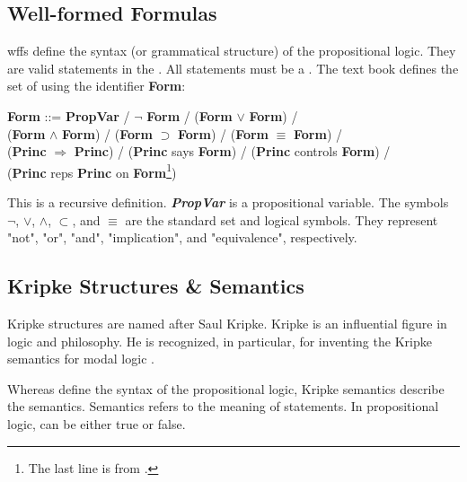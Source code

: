 \documentclass[../../main/main.tex]{subfiles}
\begin{document}
\subsection{Well-formed Formulas}\label{ssec:wff}
\Glspl{wff} define the syntax (or grammatical structure) of the propositional logic.  They are valid statements in the .  All  statements must be a .  The text book defines the set of  using the identifier \textbf{Form}:

\begin{center}
\textbf{Form} ::= \textbf{PropVar} / $\neg$ \textbf{Form} / (\textbf{Form} $\vee$ \textbf{Form}) / \\ 
	                  (\textbf{Form} $\wedge$ \textbf{Form}) / (\textbf{Form} $\supset$ \textbf{Form}) / (\textbf{Form} $\equiv$ \textbf{Form}) / \\
	                  (\textbf{Princ} $\Rightarrow$ \textbf{Princ}) / (\textbf{Princ} says \textbf{Form}) / (\textbf{Princ} controls \textbf{Form}) /\\
	                  (\textbf{Princ} reps \textbf{Princ} on \textbf{Form}\footnote{The last line is from \cite{certmanual}.})
\end{center}

This is a recursive definition.  \textbf{\textit{PropVar}} is a propositional variable.  The symbols $\neg$, $\vee$, $\wedge$, $\subset$, and $\equiv$ are the standard set and logical symbols.  They represent "not", "or", "and", "implication", and "equivalence", respectively.  

\subsection{Kripke Structures \& Semantics}\label{ssec:kripke}
Kripke structures are named after Saul Kripke.  Kripke is an influential figure in logic and philosophy.  He is recognized, in particular, for inventing the Kripke semantics for modal logic \cite{saulk}.    

Whereas  define the syntax of the propositional logic, Kripke semantics describe the semantics.  Semantics refers to the meaning of statements.  In propositional logic,  can be either true or false.  
\end{document}
